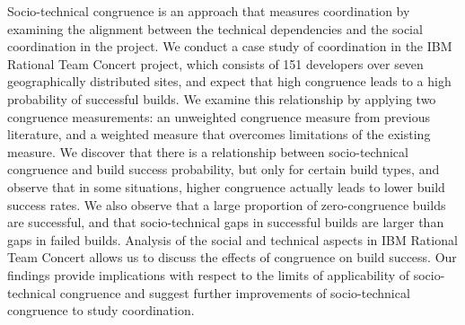 Socio-technical congruence is an approach that measures coordination by examining the alignment between the technical dependencies and the social coordination in the project.
We conduct a case study of coordination in the IBM\textsuperscript{\textregistered} Rational Team Concert\textsuperscript{\textregistered} project, which consists of 151 developers over seven geographically distributed sites, and expect that high congruence leads to a high probability of successful builds.
We examine this relationship by applying two congruence measurements: an unweighted congruence measure from previous literature, and a weighted measure that overcomes limitations of the existing measure. We discover that there is a relationship between socio-technical congruence and build success probability, but only for certain build types, and observe that in some situations, higher congruence actually leads to lower build success rates.
We also observe that a large proportion of zero-congruence builds are successful, and that socio-technical gaps in successful builds are larger than gaps in failed builds.
Analysis of the social and technical aspects in IBM\textsuperscript{\textregistered} Rational Team Concert\textsuperscript{\textregistered} allows us to discuss the effects of congruence on build success.
Our findings provide implications with respect to the limits of applicability of socio-technical congruence and suggest further improvements of socio-technical congruence to study coordination. 
